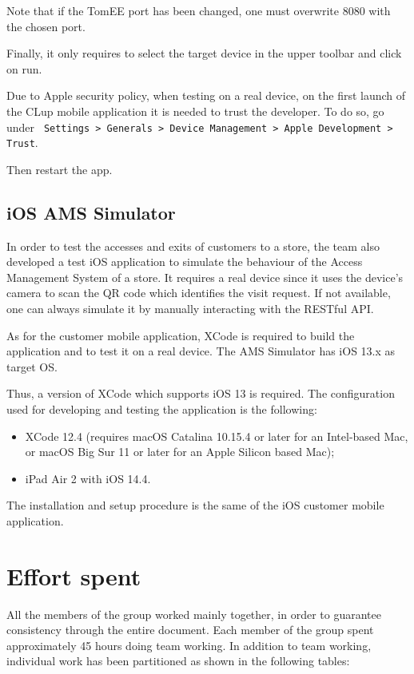 \documentclass[a4paper,oneside,11pt]{book}
\begin{document}
    Note that if the TomEE port has been changed, one must overwrite 8080 with the chosen port. \par
    Finally, it only requires to select the target device in the upper toolbar and click on run. \par
    Due to Apple security policy, when testing on a real device, on the first launch of the CLup mobile application it is needed to trust the developer. To do so, go under \texttt{
    Settings > Generals > Device Management > Apple Development > Trust}. \par
    Then restart the app.

    \section{iOS AMS Simulator}
    In order to test the accesses and exits of customers to a store, the team also developed a test iOS application to simulate the behaviour of the Access Management System of a store. It requires a real device since it uses the device’s camera to scan the QR code which identifies the visit request. If not available, one can always simulate it by manually interacting with the RESTful API.  \par
    As for the customer mobile application, XCode is required to build the application and to test it on a real device. The AMS Simulator has iOS 13.x as target OS. \par
    Thus, a version of XCode which supports iOS 13 is required. The configuration used for developing and testing the application is the following:
    \begin{itemize}
        \item XCode 12.4 (requires macOS Catalina 10.15.4 or later for an Intel-based Mac, or macOS Big Sur 11 or later for an Apple Silicon based Mac);
        \item iPad Air 2 with iOS 14.4.
    \end{itemize}
    The installation and setup procedure is the same of the iOS customer mobile application. 

\chapter{Effort spent}
    All the members of the group worked mainly together, in order to guarantee consistency through the entire document. Each member of the group spent approximately 45 hours doing team working. In addition to team working, individual work has been partitioned as shown in the following tables:
\end{document}
